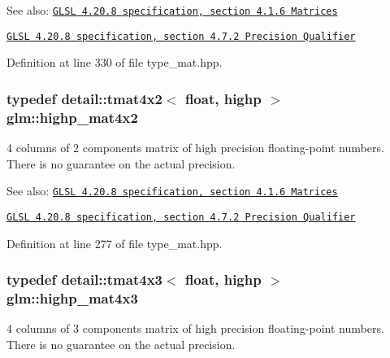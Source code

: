 \begin{Desc}
\item[See also:]\href{http://www.opengl.org/registry/doc/GLSLangSpec.4.20.8.pdf}{\tt GLSL 4.20.8 specification, section 4.1.6 Matrices} 

\href{http://www.opengl.org/registry/doc/GLSLangSpec.4.20.8.pdf}{\tt GLSL 4.20.8 specification, section 4.7.2 Precision Qualifier} \end{Desc}


Definition at line 330 of file type\_\-mat.hpp.\hypertarget{group__core__precision_gdf9c4a7947c2b0a79f52cc86a860f270}{
\subsubsection[highp\_\-mat4x2]{\setlength{\rightskip}{0pt plus 5cm}typedef detail::tmat4x2$<$ float, highp $>$ {\bf glm::highp\_\-mat4x2}}}
\label{group__core__precision_gdf9c4a7947c2b0a79f52cc86a860f270}


4 columns of 2 components matrix of high precision floating-point numbers. There is no guarantee on the actual precision.

\begin{Desc}
\item[See also:]\href{http://www.opengl.org/registry/doc/GLSLangSpec.4.20.8.pdf}{\tt GLSL 4.20.8 specification, section 4.1.6 Matrices} 

\href{http://www.opengl.org/registry/doc/GLSLangSpec.4.20.8.pdf}{\tt GLSL 4.20.8 specification, section 4.7.2 Precision Qualifier} \end{Desc}


Definition at line 277 of file type\_\-mat.hpp.\hypertarget{group__core__precision_gb8dfe989c5100c35ab5dec0e94f59d2a}{
\subsubsection[highp\_\-mat4x3]{\setlength{\rightskip}{0pt plus 5cm}typedef detail::tmat4x3$<$ float, highp $>$ {\bf glm::highp\_\-mat4x3}}}
\label{group__core__precision_gb8dfe989c5100c35ab5dec0e94f59d2a}


4 columns of 3 components matrix of high precision floating-point numbers. There is no guarantee on the actual precision.

